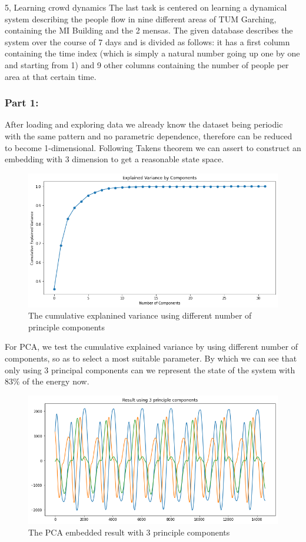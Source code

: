 \documentclass[10pt,a4paper]{article}
\begin{document}
\begin{task}{5, Learning crowd dynamics}
The last task is centered on learning a dynamical system describing the people flow in nine different areas of TUM Garching, containing the MI Building and the 2 mensas. The given database describes the system over the course of 7 days and is divided as follows: it has a first column containing the time index (which is simply a natural number going up one by one and starting from 1) and 9 other columns containing the number of people per area at that certain time. 

\subsubsection*{Part 1:}
After loading and exploring data we already know the dataset being periodic with the same pattern and no parametric dependence, therefore can be reduced to become 1-dimensional. Following Takens theorem we can assert to construct an embedding with 3 dimension to get a reasonable state space. 

\begin{figure}[H]
    \centering
    \includegraphics[width=12cm]{images/task5-1-PCA.png}
    \caption{The cumulative explanined variance using different number of principle components}
    \label{5-1-PCA}
\end{figure}
For PCA, we test the cumulative explained variance by using different number of components, so as to select a most suitable parameter. By which we can see that only using 3 principal components can we represent the state of the system with $83\%$ of the energy now.

\begin{figure}[H]
    \centering
    \includegraphics[width=12cm]{images/task5-1.png}
    \caption{The PCA embedded result with 3 principle components}
    \label{5-1}
\end{figure}


\end{task}
\end{document}
